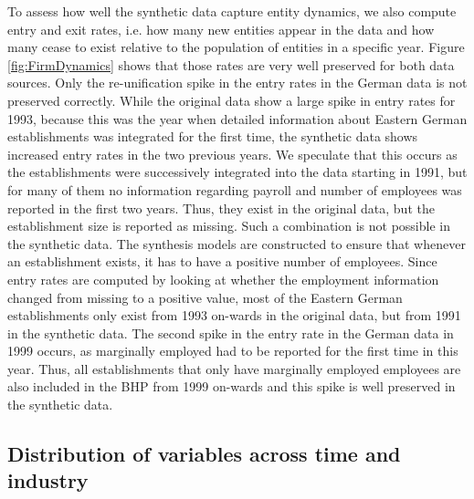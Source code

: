 To assess how well the synthetic data capture entity dynamics, we also compute entry and exit rates, i.e. how many new entities appear in the data and how many cease to exist relative to the population of entities in a specific year. Figure \ref{fig:FirmDynamics} shows that those rates are very well preserved for both data sources. Only the re-unification spike in the entry rates in the German data is not preserved correctly. While the original data show a large spike in entry rates for 1993, because this was the year when detailed information about Eastern German establishments was integrated for the first time, the synthetic data shows increased entry rates in the two previous years. We speculate that this occurs as the establishments were successively integrated into the data starting in 1991, but for many of them no information regarding payroll and number of employees was reported in the first two years. Thus, they exist in the original data, but the establishment size is reported as missing. Such a combination is not possible in the synthetic data. The synthesis models are constructed to ensure that whenever an establishment exists, it has to have a positive number of employees. Since entry rates are computed by looking at whether the employment information changed from missing to a positive value, most of the Eastern German establishments only exist from 1993 on-wards in the original data, but from 1991 in the synthetic data.
The second spike in the entry rate in the German data in 1999 occurs, as marginally employed had to be reported for the first time in this year. Thus, all establishments that only have marginally employed employees are also included in the BHP from 1999 on-wards and this spike is well preserved in the synthetic data.


\FloatBarrier


\subsection{Distribution of variables across time and industry}


